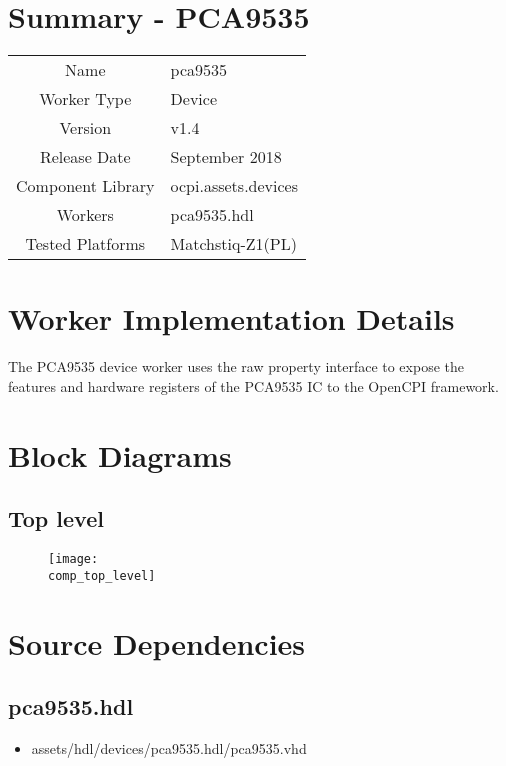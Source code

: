 \documentclass{article}
\author{} %
\date{Version \docVersion} %
\title{\docTitle}
\def\docVersion{1.4}
\def\comp{pca9535}
\def\Comp{PCA9535}
\begin{document}
\section*{Summary - \Comp}
\begin{tabular}{|c|M{13.5cm}|}
	\hline
	                  &                                        \\
	\hline
	Name              & \comp                                  \\
	\hline
	Worker Type       & Device                                 \\
	\hline
	Version           & v\docVersion \\
	\hline
	Release Date      & September 2018 \\
	\hline
	Component Library & ocpi.assets.devices                     \\
	\hline
	Workers           & \comp.hdl                              \\
	\hline
	Tested Platforms  & Matchstiq-Z1(PL)                       \\
	\hline
\end{tabular}

\section*{Worker Implementation Details}
The \Comp{} device worker uses the raw property interface to expose the features and hardware registers of the \Comp{} IC to the OpenCPI framework.

\section*{Block Diagrams}
\subsection*{Top level}
\begin{figure}[ht]
	\centerline{\texttt{[image: \\comp\_top\_level]}}
	\label{fig:tb}
\end{figure}

\section*{Source Dependencies}
\subsection*{\comp.hdl}
\begin{itemize}
	\item assets/hdl/devices/\comp.hdl/\comp.vhd
\end{itemize}
\end{document}
